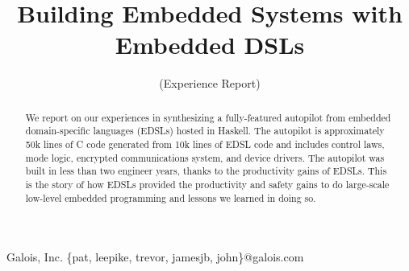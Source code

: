 \documentclass{sigplanconf}
\begin{document}
\setlength{\pdfpageheight}{\paperheight}
\setlength{\pdfpagewidth}{\paperwidth}






\title{Building Embedded Systems with Embedded DSLs}
\subtitle{(Experience Report)}

           {Galois, Inc.}
           {\{pat, leepike, trevor, jamesjb, john\}@galois.com}

\maketitle

\begin{abstract}
We report on our experiences in synthesizing a fully-featured autopilot from
embedded domain-specific languages (EDSLs) hosted in Haskell.  The autopilot is
approximately 50k lines of C code generated from 10k lines of EDSL code and
includes control laws, mode logic, encrypted communications system, and device
drivers.  The autopilot was built in less than two engineer years, thanks to the
productivity gains of EDSLs.  This is the story of how EDSLs provided the
productivity and safety gains to do large-scale low-level embedded programming
and lessons we learned in doing so.
\end{abstract}


\end{document}

